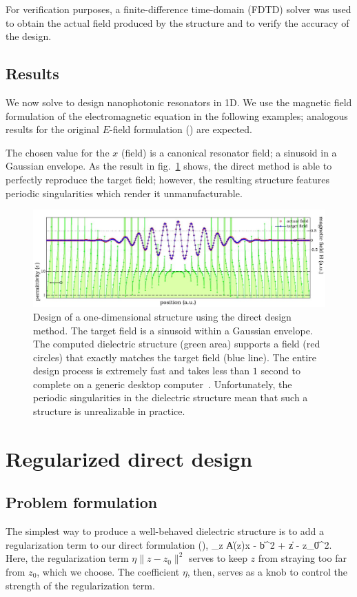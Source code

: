 For verification purposes, 
    a finite-difference time-domain (FDTD) solver was used 
    to obtain the actual field produced by the structure and 
    to verify the accuracy of the design.  

\section{Results}
We now solve  to design nanophotonic resonators in 1D.
We use the magnetic field formulation of the electromagnetic equation
    in the following examples;
    analogous results for the original $E$-field formulation ()
    are expected.

The chosen value for the $x$ (field) is a canonical resonator field; 
    a sinusoid in a Gaussian envelope.
As the result in fig.~\ref{p1:direct} shows,
    the direct method is able to perfectly reproduce the target field;
    however, the resulting structure features
    periodic singularities which render it unmanufacturable.

\begin{figure}[htbp]\centering
\includegraphics[width=\textwidth]{p1/leastsquares}
\caption{Design of a one-dimensional structure using the direct design method.
    The target field is a sinusoid within a Gaussian envelope. 
    The computed dielectric structure (green area) supports 
        a field (red circles) that exactly matches the target field (blue line). 
    The entire design process is extremely fast and takes less than 
        $1$ second to complete on a generic desktop computer~\cite{mycomp}. 
    Unfortunately, the periodic singularities in the dielectric structure 
        mean that such a structure is unrealizable in practice.}
\label{p1:direct}\end{figure}

\chapter{Regularized direct design}\label{regularized}
\section{Problem formulation}
The simplest way to produce a well-behaved dielectric structure is 
    to add a regularization term to our direct formulation (),
    \BE \minimize_z \|A(z)x - b\|^2 + \eta \|z - z_0\|^2. \label{reg:problem}\EE
Here, the regularization term $\eta \|z - z_0\|^2$
    serves to keep $z$ from straying too far from $z_0$, which we choose.
The coefficient $\eta$, then, serves as a knob to control the
    strength of the regularization term.

